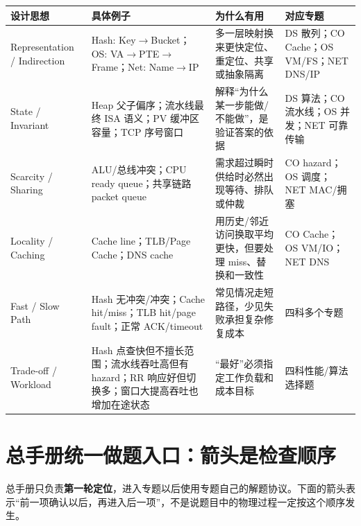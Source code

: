 \documentclass[11pt,a4paper,openany]{ctexbook}
\newcommand{\key}[1]{\textbf{\color{deep}#1}}
\begin{document}
\begin{longtable}{L{3.0cm}L{4.3cm}L{4.3cm}L{\dimexpr\linewidth-12.87cm\relax}}
\toprule
\textbf{设计思想} & \textbf{具体例子} & \textbf{为什么有用} & \textbf{对应专题}\\
\midrule
Representation / Indirection & Hash: Key$\to$Bucket；OS: VA$\to$PTE$\to$Frame；Net: Name$\to$IP & 多一层映射换来更快定位、重定位、共享或抽象隔离 & DS 散列；CO Cache；OS VM/FS；NET DNS/IP \\
\midrule
State / Invariant & Heap 父子偏序；流水线最终 ISA 语义；PV 缓冲区容量；TCP 序号窗口 & 解释“为什么某一步能做/不能做”，是验证答案的依据 & DS 算法；CO 流水线；OS 并发；NET 可靠传输 \\
\midrule
Scarcity / Sharing & ALU/总线冲突；CPU ready queue；共享链路 packet queue & 需求超过瞬时供给时必然出现等待、排队或仲裁 & CO hazard；OS 调度；NET MAC/拥塞 \\
\midrule
Locality / Caching & Cache line；TLB/Page Cache；DNS cache & 用历史/邻近访问换取平均更快，但要处理 miss、替换和一致性 & CO Cache；OS VM/IO；NET DNS \\
\midrule
Fast / Slow Path & Hash 无冲突/冲突；Cache hit/miss；TLB hit/page fault；正常 ACK/timeout & 常见情况走短路径，少见失败承担复杂修复成本 & 四科多个专题 \\
\midrule
Trade-off / Workload & Hash 点查快但不擅长范围；流水线吞吐高但有 hazard；RR 响应好但切换多；窗口大提高吞吐也增加在途状态 & “最好”必须指定工作负载和成本目标 & 四科性能/算法选择题 \\
\bottomrule
\end{longtable}

\section{总手册统一做题入口：箭头是检查顺序}
总手册只负责\key{第一轮定位}，进入专题以后使用专题自己的解题协议。下面的箭头表示“前一项确认以后，再进入后一项”，不是说题目中的物理过程一定按这个顺序发生。
\end{document}

